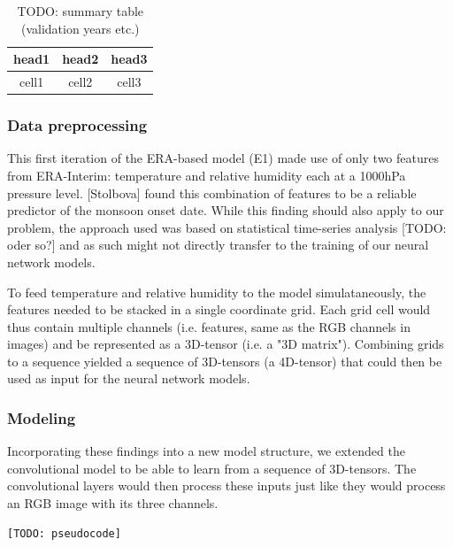 \begin{table}[h]
  \centering
  \begin{tabular}{ |c|c|c| }
    \hline
    head1 & head2 & head3 \\
    \hline
    cell1 & cell2 & cell3 \\
    \hline
  \end{tabular}
  \caption{TODO: summary table (validation years etc.)}
  \label{tab:nn_e1_summary}
\end{table}

\subsubsection{Data preprocessing}
\label{ssst:nn_e1_data}
This first iteration of the ERA-based model (E1) made use of only two features from ERA-Interim: temperature and relative humidity each at a 1000hPa pressure level. [Stolbova] found this combination of features to be a reliable predictor of the monsoon onset date. While this finding should also apply to our problem, the approach used was based on statistical time-series analysis [TODO: oder so?] and as such might not directly transfer to the training of our neural network models.

To feed temperature and relative humidity to the model simulataneously, the features needed to be stacked in a single coordinate grid. Each grid cell would thus contain multiple channels (i.e. features, same as the RGB channels in images) and be represented as a 3D-tensor (i.e. a "3D matrix"). Combining grids to a sequence yielded a sequence of 3D-tensors (a 4D-tensor) that could then be used as input for the neural network models.

\subsubsection{Modeling}
\label{ssst:nn_e1_modeling}
Incorporating these findings into a new model structure, we extended the convolutional model to be able to learn from a sequence of 3D-tensors. The convolutional layers would then process these inputs just like they would process an RGB image with its three channels.

\begin{figure}[h]
\end{figure}

\begin{lstlisting}[language=Python]
  [TODO: pseudocode]
\end{lstlisting}

